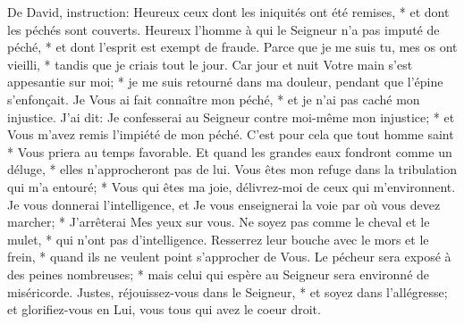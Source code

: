 De David, instruction: Heureux ceux dont les iniquités ont été remises, * et dont les péchés sont couverts.
Heureux l'homme à qui le Seigneur n'a pas imputé de péché, * et dont l'esprit est exempt de fraude.
Parce que je me suis tu, mes os ont vieilli, * tandis que je criais tout le jour.
Car jour et nuit Votre main s'est appesantie sur moi; * je me suis retourné dans ma douleur, pendant que l'épine s'enfonçait.
Je Vous ai fait connaître mon péché, * et je n'ai pas caché mon injustice. J'ai dit: Je confesserai au Seigneur contre moi-même mon injustice; * et Vous m'avez remis l'impiété de mon péché.
C'est pour cela que tout homme saint * Vous priera au temps favorable. Et quand les grandes eaux fondront comme un déluge, * elles n'approcheront pas de lui.
Vous êtes mon refuge dans la tribulation qui m'a entouré; * Vous qui êtes ma joie, délivrez-moi de ceux qui m'environnent.
Je vous donnerai l'intelligence, et Je vous enseignerai la voie par où vous devez marcher; * J'arrêterai Mes yeux sur vous.
Ne soyez pas comme le cheval et le mulet, * qui n'ont pas d'intelligence. Resserrez leur bouche avec le mors et le frein, * quand ils ne veulent point s'approcher de Vous.
Le pécheur sera exposé à des peines nombreuses; * mais celui qui espère au Seigneur sera environné de miséricorde.
Justes, réjouissez-vous dans le Seigneur, * et soyez dans l'allégresse; et glorifiez-vous en Lui, vous tous qui avez le coeur droit.

